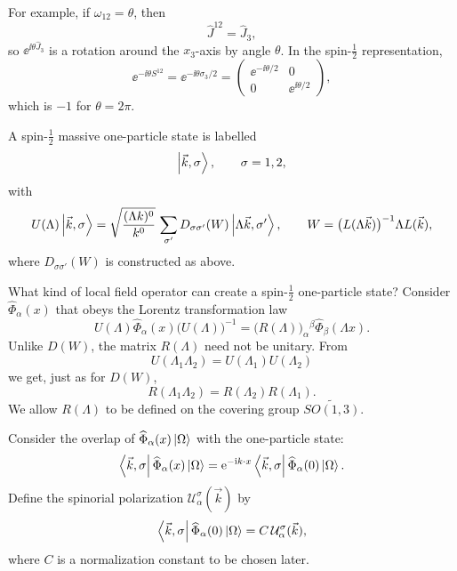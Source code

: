 For example, if \(\omega_{12}=\theta\), then
\[
  \widehat J^{12}=\widehat J_3,
\]
so \(\ee^{\ii\theta\widehat J_3}\) is a rotation around the \(x_3\)-axis by
angle \(\theta\).  In the spin-\(\frac12\) representation,
\[
  \ee^{-\ii\theta S^{12}}
  =
  \ee^{-\ii\theta\sigma_3/2}
  =
  \begin{pmatrix}
    \ee^{-\ii\theta/2} & 0\\
    0 & \ee^{\ii\theta/2}
  \end{pmatrix},
\]
which is \(-1\) for \(\theta=2\pi\).

A spin-\(\frac12\) massive one-particle state is labelled
\[
  \ket{\vec k,\sigma},\qquad \sigma=1,2,
\]
with
\[
  U(\Lambda)\ket{\vec k,\sigma}
  =
  \sqrt{\frac{(\Lambda k)^0}{k^0}}\,
  \sum_{\sigma'}D_{\sigma\sigma'}(W)\ket{\Lambda\vec k,\sigma'},
  \qquad
  W=\bigl(L(\Lambda\vec k)\bigr)^{-1}\Lambda L(\vec k),
\]
where \(D_{\sigma\sigma'}(W)\) is constructed as above.

What kind of local field operator can create a spin-\(\frac12\) one-particle
state?  Consider \(\widehat\Phi_\alpha(x)\) that obeys the Lorentz
transformation law
\[
  U(\Lambda)\widehat\Phi_\alpha(x)\bigl(U(\Lambda)\bigr)^{-1}
  =
  \bigl(R(\Lambda)\bigr)_\alpha{}^\beta
  \widehat\Phi_\beta(\Lambda x).
\]
Unlike \(D(W)\), the matrix \(R(\Lambda)\) need not be unitary.  From
\[
  U(\Lambda_1\Lambda_2)=U(\Lambda_1)U(\Lambda_2)
\]
we get, just as for \(D(W)\),
\[
  R(\Lambda_1\Lambda_2)=R(\Lambda_2)R(\Lambda_1).
\]
We allow \(R(\Lambda)\) to be defined on the covering group
\(\widetilde{SO(1,3)}\).

Consider the overlap of \(\widehat\Phi_\alpha(x)\ket\Omega\) with the
one-particle state:
\[
  \bra{\vec k,\sigma}\widehat\Phi_\alpha(x)\ket\Omega
  =
  \mathrm{e}^{-\mathrm{i} k\cdot x}
  \bra{\vec k,\sigma}\widehat\Phi_\alpha(0)\ket\Omega.
\]
Define the spinorial polarization \(\mathcal U_\alpha^\sigma(\vec k)\) by
\[
  \bra{\vec k,\sigma}\widehat\Phi_\alpha(0)\ket\Omega
  =
  C\,\mathcal U_\alpha^\sigma(\vec k),
\]
where \(C\) is a normalization constant to be chosen later.

